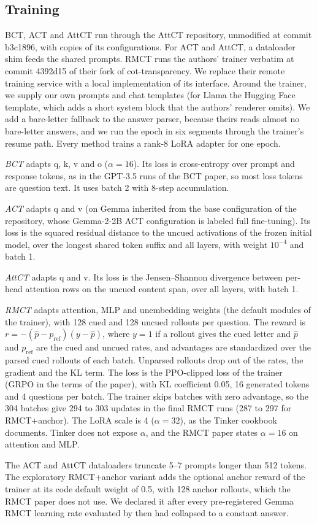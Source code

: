 \documentclass[11pt]{article}
\newenvironment{tightlist}{\begin{list}{\textbullet}{\setlength{\leftmargin}{1.1em}\setlength{\labelwidth}{0.7em}\setlength{\labelsep}{0.4em}\setlength{\itemsep}{1pt}\setlength{\topsep}{2pt}\setlength{\parsep}{0pt}}}{\end{list}}
\newcommand{\gemma}{Gemma}\newcommand{\gemmafull}{Gemma-2-2B-it}
\newcommand{\llama}{Llama}\newcommand{\llamafull}{Llama-3.1-8B-Instruct}
\begin{document}
\subsection{Training}
BCT, ACT and AttCT run through the AttCT repository, unmodified at commit b3c1896, with copies of its configurations. For ACT and AttCT, a dataloader shim feeds the shared prompts. RMCT runs the authors' trainer verbatim at commit 4392d15 of their fork of cot-transparency. We replace their remote training service \citep[Tinker;][]{tinker2025} with a local implementation of its interface. Around the trainer, we supply our own prompts and chat templates (for \llama{} the Hugging Face template, which adds a short system block that the authors' renderer omits). We add a bare-letter fallback to the answer parser, because theirs reads almost no bare-letter answers, and we run the epoch in six segments through the trainer's resume path. Every method trains a rank-8 LoRA adapter for one epoch.
\begin{tightlist}
\item \emph{BCT} adapts q, k, v and o ($\alpha{=}16$). Its loss is cross-entropy over prompt and response tokens, as in the GPT-3.5 runs of the BCT paper, so most loss tokens are question text. It uses batch 2 with 8-step accumulation.
\item \emph{ACT} adapts q and v (on \gemma{} inherited from the base configuration of the repository, whose Gemma-2-2B ACT configuration is labeled full fine-tuning). Its loss is the squared residual distance to the uncued activations of the frozen initial model, over the longest shared token suffix and all layers, with weight $10^{-4}$ and batch 1.
\item \emph{AttCT} adapts q and v. Its loss is the Jensen--Shannon divergence between per-head attention rows on the uncued content span, over all layers, with batch 1.
\item \emph{RMCT} adapts attention, MLP and unembedding weights (the default modules of the trainer), with 128 cued and 128 uncued rollouts per question. The reward is $r=-(\hat p-p_{\mathrm{ref}})(y-\hat p)$, where $y=1$ if a rollout gives the cued letter and $\hat p$ and $p_{\mathrm{ref}}$ are the cued and uncued rates, and advantages are standardized over the parsed cued rollouts of each batch. Unparsed rollouts drop out of the rates, the gradient and the KL term. The loss is the PPO-clipped loss of the trainer (GRPO in the terms of the paper), with KL coefficient 0.05, 16 generated tokens and 4 questions per batch. The trainer skips batches with zero advantage, so the 304 batches give 294 to 303 updates in the final RMCT runs (287 to 297 for RMCT+anchor). The LoRA scale is 4 ($\alpha{=}32$), as the Tinker cookbook documents. Tinker does not expose $\alpha$, and the RMCT paper states $\alpha{=}16$ on attention and MLP.
\end{tightlist}
The ACT and AttCT dataloaders truncate 5--7 prompts longer than 512 tokens. The exploratory RMCT+anchor variant adds the optional anchor reward of the trainer at its code default weight of 0.5, with 128 anchor rollouts, which the RMCT paper does not use. We declared it after every pre-registered \gemma{} RMCT learning rate evaluated by then had collapsed to a constant answer.
\end{document}
